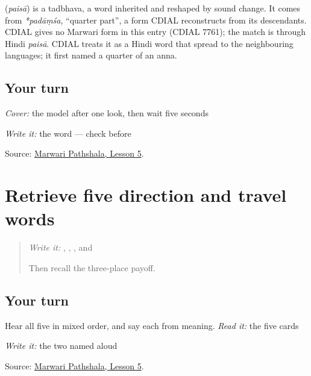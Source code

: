 \begin{cousinweb}
\textbf{} (\emph{paisā}) is a tadbhava, a word inherited and reshaped by sound change. It comes from \emph{*padāṃśa}, \textquotedblleft{}quarter part\textquotedblright{}, a form CDIAL reconstructs from its descendants. CDIAL gives no Marwari form in this entry (CDIAL 7761); the match is through Hindi \emph{paisā}. CDIAL treats it as a Hindi word that spread to the neighbouring languages; it first named a quarter of an anna.
\end{cousinweb}

\subsection*{Your turn}
\emph{Cover:} the model after one look, then wait five seconds

\emph{Write it:} the word — check \textbf{} before \textbf{}

\begin{tcolorbox}[breakable,colback=teal!4,colframe=teal!35!black,title={Before you move on}]
Source: \href{https://www.marwaripathshala.com/marwari-lesson-5-english}{Marwari Pathshala, Lesson 5}.
\end{tcolorbox}
\section[Practice]{Retrieve five direction and travel words}

\label{lesson:MW-R10-travel-five}



\begin{quote}
\emph{Write it:} \textbf{}, \textbf{}, \textbf{}, and \textbf{}

Then recall the three-place payoff.
\end{quote}

\subsection*{Your turn}
Hear all five in mixed order, and say each from meaning. \emph{Read it:} the five cards

\emph{Write it:} the two named aloud

\begin{tcolorbox}[breakable,colback=teal!4,colframe=teal!35!black,title={Before you move on}]
Source: \href{https://www.marwaripathshala.com/marwari-lesson-5-english}{Marwari Pathshala, Lesson 5}.
\end{tcolorbox}
